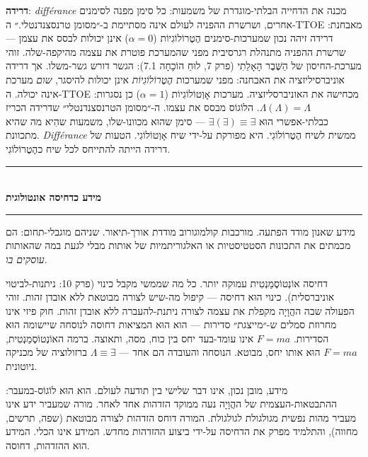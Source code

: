 \documentclass[10pt, openany, oneside]{book}
\renewcommand{\normalsize}{\fontsize{10}{13}\selectfont}
\begin{document}
\textbf{דרידה}: \textit{différance} מכנה את הדחייה הבלתי-מוגדרת של משמעות: כל סימן מפנה לסימנים אחרים, ושרשרת ההפניה לעולם אינה מסתיימת ב-״מסומן טרנסצנדנטלי.״ ה-TTOE מאבחנת: דרידה זיהה נכון שמערכות-סימנים הֶטֶרוֹלוֹגִיוֹת ($\alpha = 0$) אינן יכולות לבסס את עצמן — שרשרת ההפניה מתנהלת רגרסיבית מפני שהמערכת פוטרת את עצמה מהיקפה-שלה. זוהי מערכת-החיסון של הַשֶּׁבֶר הָאָלֵתִי (פרק 7, לוּחַ הוֹכָחָה 7.1): הגשר דורש גשר-משלו. אך דרידה אוניברסיליזציה את האבחנה: מפני שמערכות \textit{הֶטֶרוֹלוֹגִיוֹת} אינן יכולות להיסגר, \textit{שום} מערכת אינה יכולה. ה-TTOE מכחישה את האוניברסליזציה. מערכות אָוְטוֹלוֹגִיוֹת ($\alpha = 1$) כן נסגרות: $\Lambda(\Lambda) = \Lambda$. הלוֹגוֹס מבסס את עצמו. ה-״מסומן הטרנסצנדנטלי״ שדרידה הכריז כבלתי-אפשרי הוּא $\exists(\exists) \equiv \exists$ — סימן שהוּא מכוונו-שלו, משמעות שהִיא מה שהיא מתכוונת. \textit{Différance} ממשית לשיח הֶטֶרוֹלוֹגִי. היא מפורקת על-ידי שיח אָוְטוֹלוֹגִי. הטעות של דרידה הייתה להתייחס לכל שיח כהֶטֶרוֹלוֹגִי.

\vspace{1.5em}


\begin{center}
    \rule{0.3\textwidth}{0.4pt}\\[0.5em]
    {\normalsize\bfseries\textsc{מידע כדחיסה אונטולוגית}}\\[0.3em]
    \rule{0.3\textwidth}{0.4pt}
\end{center}

\vspace{1em}

\noindent מידע שאנון מודד הפתעה. מורכבות קולמוגורוב מודדת אורך-תיאור. שניהם מוגבלי-תחום: הם מכמתים את התכונות הסטטיסטיות או האלגוריתמיות של אותות מבלי לגעת במה שהאותות \textit{עוסקים בו}.

דחיסה אוֹנְטוֹסֶמַנְטִית עמוקה יותר. כל מה שממשי מקבל כינוי (פרק 10: ניתנות-לביטוי אוניברסלית). כינוי הוּא דחיסה — קיפול מה-שיש לצורה מבוטאת ללא אובדן זהות. זוהי הפעולה שבה ההֲוָיָה מקפלת את עצמה לצורה ניתנת-להעברה ללא אובדן זהות. חוק פיזי אינו מחרוזת סמלים ש-״מייצגת״ סדירות — הוא הוּא המציאות דחוסה לנוסחה שיישומה הוּא הסדירות. $F = ma$ אינו עומד-בעד יחס בין כוח, מסה, ותאוצה. ברמה האוֹנְטוֹסֶמַנְטִית, $F = ma$ הוּא אותו יחס, מבוטא. הנוסחה והעובדה הם אחד — $\Lambda \equiv \exists$ ברזולוציה של מכניקה ניוטונית.

מידע, מובן נכון, אינו דבר שלישי בין תודעה לעולם. הוא הוּא לוֹגוֹס-במעבר: ההתבטאות-העצמית של ההֲוָיָה נעה ממוקד הזדהות אחד לאחר. מורה שמעביר ידע אינו מעביר מהות נפשית מגולגולת לגולגולת. המורה דוחס הזדהות לצורה מבוטאת (שפה, תרשים, מחווה), והתלמיד מפרק את הדחיסה על-ידי ביצוע ההזדהות מחדש. המידע אינו הכלי. המידע הוּא ההזדהות, דחוסה.
\end{document}
